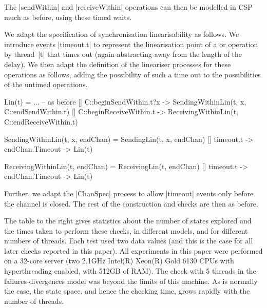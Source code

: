 The |sendWithin| and |receiveWithin| operations can then be modelled in CSP
much as before, using these timed waits.



\inlineCSP

We adapt the specification of synchronisation linearisability as follows.  We
introduce events |timeout.t| to represent the linearisation point of a
 or  operation by thread~|t| that times
out (again abstracting away from the length of the delay).  We then adapt the
definition of the lineariser processes for these operations as follows, adding
the possibility of such a time out to the possibilities of the untimed
operations.
%
\begin{cspm}
Lin(t) = 
  ... -- as before
  [] C::beginSendWithin.t?x -> SendingWithinLin(t, x, C::endSendWithin.t)
  [] C::beginReceiveWithin.t -> ReceivingWithinLin(t, C::endReceiveWithin.t)

SendingWithinLin(t, x, endChan) = 
  SendingLin(t, x, endChan)
  [] timeout.t -> endChan.Timeout -> Lin(t)

ReceivingWithinLin(t, endChan) = 
  ReceivingLin(t, endChan) 
  [] timeout.t -> endChan.Timeout -> Lin(t)
\end{cspm}
%
Further, we adapt the |ChanSpec| process to allow |timeout| events only before
the channel is closed.  The rest of the construction and checks are then as
before. 

%
The table to the right gives statistics about the number of states explored
and the times taken to perform these checks, in different models, and for
different numbers of threads.  Each test used two data values (and this is the
case for all later checks reported in this paper).  All
experiments in this paper were performed on a 32-core server (two 2.1GHz
Intel(R) Xeon(R) Gold 6130 CPUs with hyperthreading enabled, with 512GB of
RAM).  The check with 5 threads in the failures-divergences model was beyond
the limits of this machine.  As is normally the case, the state space, and
hence the checking time, grows rapidly with the number of threads.   
\end{window}

